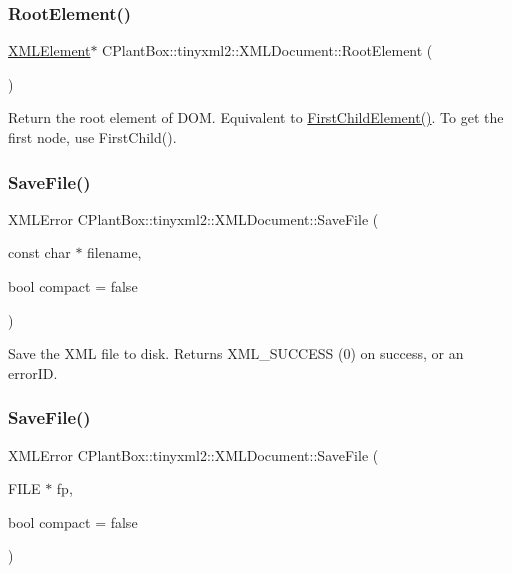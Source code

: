 \subsubsection{\texorpdfstring{Root\+Element()}{RootElement()}}
{\footnotesize\ttfamily \hyperlink{classCPlantBox_1_1tinyxml2_1_1XMLElement}{X\+M\+L\+Element}$\ast$ C\+Plant\+Box\+::tinyxml2\+::\+X\+M\+L\+Document\+::\+Root\+Element (\begin{DoxyParamCaption}{ }\end{DoxyParamCaption})\hspace{0.3cm}{\ttfamily [inline]}}

Return the root element of D\+OM. Equivalent to \hyperlink{classCPlantBox_1_1tinyxml2_1_1XMLNode_a47764229f183f01c147e5d0b0e2534a5}{First\+Child\+Element()}. To get the first node, use First\+Child(). \mbox{\label{classCPlantBox_1_1tinyxml2_1_1XMLDocument_a5c24e667bb4e75ef562e9c7002de08f5}} 
\subsubsection{\texorpdfstring{Save\+File()}{SaveFile()}\hspace{0.1cm}{\footnotesize\ttfamily [1/2]}}
{\footnotesize\ttfamily X\+M\+L\+Error C\+Plant\+Box\+::tinyxml2\+::\+X\+M\+L\+Document\+::\+Save\+File (\begin{DoxyParamCaption}\item[{const char $\ast$}]{filename,  }\item[{bool}]{compact = {\ttfamily false} }\end{DoxyParamCaption})}

Save the X\+ML file to disk. Returns X\+M\+L\+\_\+\+S\+U\+C\+C\+E\+SS (0) on success, or an error\+ID. \mbox{\label{classCPlantBox_1_1tinyxml2_1_1XMLDocument_a5bc85793a09dc7b2c4c7c66df469ed8c}} 
\subsubsection{\texorpdfstring{Save\+File()}{SaveFile()}\hspace{0.1cm}{\footnotesize\ttfamily [2/2]}}
{\footnotesize\ttfamily X\+M\+L\+Error C\+Plant\+Box\+::tinyxml2\+::\+X\+M\+L\+Document\+::\+Save\+File (\begin{DoxyParamCaption}\item[{F\+I\+LE $\ast$}]{fp,  }\item[{bool}]{compact = {\ttfamily false} }\end{DoxyParamCaption})}

